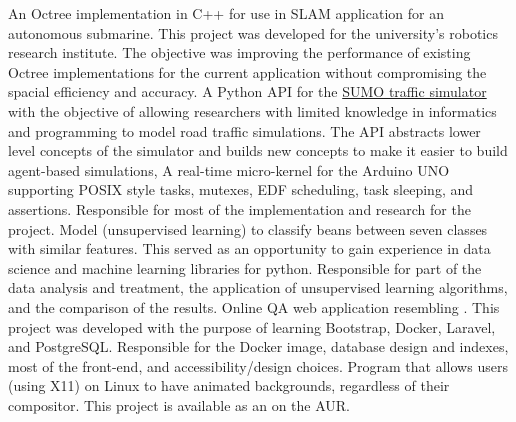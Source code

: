 \documentclass[letterpaper]{twentysecondcv} %
\begin{document}
\begin{twenty}
    {}
    {An Octree implementation in C++ for use in SLAM application for an autonomous
    submarine. This project was developed for the university's robotics research
    institute. The objective was improving the performance of existing Octree
    implementations for the current application without compromising the
    spacial efficiency and accuracy.}
    {}
    {A Python API for the \href{https://www.eclipse.org/sumo/}{SUMO traffic simulator} with the
    objective of allowing researchers with limited knowledge in informatics and programming to
    model road traffic simulations. The API abstracts lower level concepts of the simulator and
    builds new concepts to make it easier to build agent-based simulations,}
    {}
    {A real-time micro-kernel for the Arduino UNO supporting POSIX style tasks, mutexes,
    EDF scheduling, task sleeping, and assertions. Responsible for most of the implementation
    and research for the project.}
    {}
    {Model (unsupervised learning) to classify beans between seven classes with similar
    features. This served as an opportunity to gain experience in data science and machine
    learning libraries for python. Responsible for part of the data analysis and treatment,
    the application of unsupervised learning algorithms, and the comparison of the results.}
    {}
    {Online QA web application resembling .
    This project was developed with the purpose of learning Bootstrap, Docker, Laravel,
    and PostgreSQL. Responsible for the Docker image, database design and indexes,
    most of the front-end, and accessibility/design choices.}
    {}
    {Program that allows users (using X11) on Linux to have animated backgrounds,
    regardless of their compositor. This project is available as an
    on the AUR.}
\end{twenty}
\end{document}
